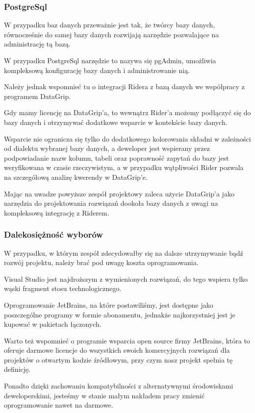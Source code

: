 \subsubsection{PostgreSql}
W przypadku baz danych przeważnie jest tak, że twórcy bazy danych, równocześnie do samej bazy danych rozwijają narzędzie pozwalające na administrację tą bazą.

W przypadku PostgreSql narzędzie to nazywa się pgAdmin, umożliwia kompleksową konfigurację bazy danych i administrowanie nią.

Należy jednak wspomnieć tu o integracji Ridera z bazą danych we współpracy z programem DataGrip.

Gdy mamy licencję na DataGrip'a, to wewnątrz Rider'a możemy podłączyć się do bazy danych i otrzymywać dodatkowe wsparcie w kontekście bazy danych.

Wsparcie nie ogranicza się tylko do dodatkowego kolorowania składni w zależności od dialektu wybranej bazy danych, a deweloper jest wspierany przez podpowiadanie nazw kolumn, tabeli oraz poprawność zapytań do bazy jest  weryfikowana w czasie rzeczywistym, a w przypadku wątpliwości Rider pozwala na szczegółową analizę kwerendy w DataGrip'e.

Mając na uwadze powyższe zespół projektowy zaleca użycie DataGrip'a jako narzędzia do projektowania rozwiązań dookoła bazy danych z uwagi na kompleksową integrację z Riderem.

\subsubsection{Dalekosiężność wyborów}
W przypadku, w którym zespół zdecydowałby się na dalsze utrzymywanie bądź rozwój projektu, należy brać pod uwagę koszta oprogramowania.

Visual Studio jest najdroższym z wymienionych rozwiązań, do tego wspiera tylko wąski fragment stosu technologicznego.

Oprogramowanie JetBrains, na które postawiliśmy, jest dostępne jako poszczególne programy w formie abonamentu, jednakże najkorzystniej jest je kupować w pakietach łączonych.

Warto też wspomnieć o programie wsparcia open source firmy JetBrains, która to oferuje darmowe licencje do wszystkich swoich komercyjnych rozwiązań dla projektów o otwartym kodzie źródłowym, przy czym nasz projekt spełnia tę definicję.

Ponadto dzięki zachowaniu kompatybilności z alternatywnymi środowiskami deweloperskimi, jesteśmy w stanie małym nakładem pracy zmienić oprogramowanie nawet na darmowe.


